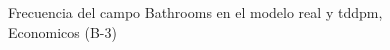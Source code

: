 \begin{figure}[H]
    \centering
    
    \caption{Frecuencia del campo Bathrooms en el modelo real y tddpm, Economicos (B-3)}
    \label{frecuency-Bathrooms-tddpm_mlp}
\end{figure}